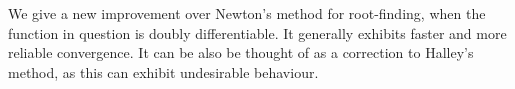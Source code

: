 We give a new improvement over Newton's method for root-finding, when the function in question is doubly differentiable. It generally exhibits faster and more reliable convergence. It can be also be thought of as a correction to Halley's method, as this can exhibit undesirable behaviour.